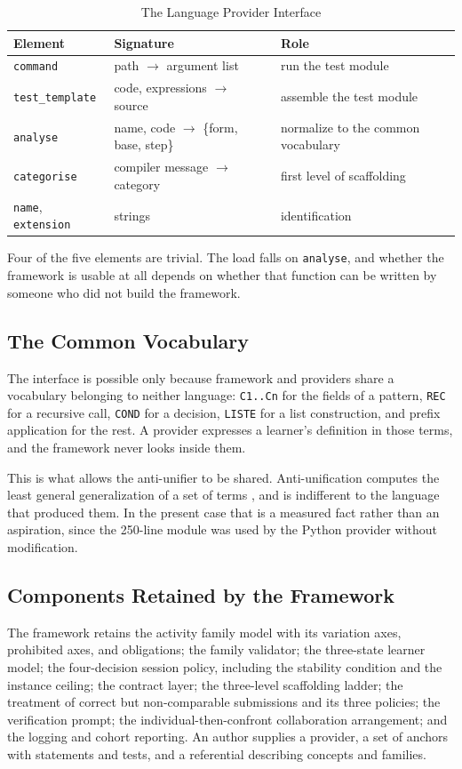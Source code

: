 \documentclass[journal]{IEEEtran}
\begin{document}
\begin{table}[t]
\centering\scriptsize\setlength{\tabcolsep}{3pt}
\caption{The Language Provider Interface}\label{tab:2}
\begin{tabular}{@{}p{0.84in}p{1.20in}p{1.26in}@{}}
\toprule
Element & Signature & Role \\
\midrule
\texttt{command} & path $\rightarrow$ argument list & run the test module \\
\texttt{test\_template} & code, expressions $\rightarrow$ source & assemble the test module \\
\texttt{analyse} & name, code $\rightarrow$ \{form, base, step\} & normalize to the common vocabulary \\
\texttt{categorise} & compiler message $\rightarrow$ category & first level of scaffolding \\
\texttt{name}, \texttt{extension} & strings & identification \\
\bottomrule
\end{tabular}
\end{table}

Four of the five elements are trivial. The load falls on
\texttt{analyse}, and whether the framework is usable at all depends on
whether that function can be written by someone who did not build the
framework.

\subsection{The Common Vocabulary}\label{sec:4.2}
The interface is possible only because framework and providers share a
vocabulary belonging to neither language: \texttt{C1..Cn} for the fields
of a pattern, \texttt{REC} for a recursive call, \texttt{COND} for a
decision, \texttt{LISTE} for a list construction, and prefix application
for the rest. A provider expresses a learner's definition in those
terms, and the framework never looks inside them.

This is what allows the anti-unifier to be shared. Anti-unification
computes the least general generalization of a set of terms \cite{b18},
\cite{b19} and is indifferent to the language that produced them. In the
present case that is a measured fact rather than an aspiration, since
the 250-line module was used by the Python provider without
modification.

\subsection{Components Retained by the Framework}\label{sec:4.3}
The framework retains the activity family model with its variation axes,
prohibited axes, and obligations; the family validator; the three-state
learner model; the four-decision session policy, including the stability
condition and the instance ceiling; the contract layer; the three-level
scaffolding ladder; the treatment of correct but non-comparable
submissions and its three policies; the verification prompt; the
individual-then-confront collaboration arrangement; and the logging and
cohort reporting. An author supplies a provider, a set of anchors with
statements and tests, and a referential describing concepts and
families.
\end{document}

